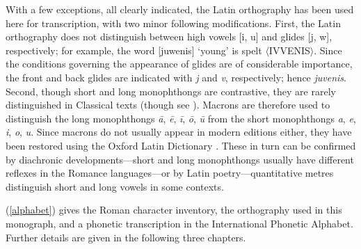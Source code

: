 With a few exceptions, all clearly indicated, the Latin orthography has been used here for transcription, with two minor following modifications.
First, the Latin orthography does not distinguish between high vowels [i, u] and glides [j, w], respectively; for example, the word [juwenis] `young' is spelt $\langle$IVVENIS$\rangle$.
Since the conditions governing the appearance of glides are of considerable importance, the front and back glides are indicated with \emph{j} and \emph{v}, respectively; hence \emph{juvenis}.
Second, though short and long monophthongs are contrastive, they are rarely distinguished in Classical texts (though see \citealp{Rolfe1922}).
Macrons are therefore used to distinguish the long monophthongs \emph{ā}, \emph{ē}, \emph{ī}, \emph{ō}, \emph{ū} from the short monophthongs 
\emph{a}, \emph{e}, \emph{i}, \emph{o}, \emph{u}.
Since macrons do not usually appear in modern editions either, they have been restored using the Oxford Latin Dictionary \citep{OLD}.
These in turn can be confirmed by diachronic developments---short and long monophthongs usually have different reflexes in the Romance languages---or by Latin poetry---quantitative metres distinguish short and long vowels in some contexts.

(\ref{alphabet}) gives the Roman character inventory, the orthography used in this monograph, and a phonetic transcription in the International Phonetic Alphabet.
Further details are given in the following three chapters.

